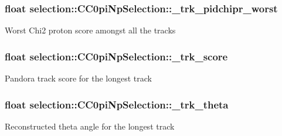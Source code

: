 \subsubsection[{\texorpdfstring{\+\_\+trk\+\_\+pidchipr\+\_\+worst}{_trk_pidchipr_worst}}]{\setlength{\rightskip}{0pt plus 5cm}float selection\+::\+C\+C0pi\+Np\+Selection\+::\+\_\+trk\+\_\+pidchipr\+\_\+worst\hspace{0.3cm}{\ttfamily [private]}}\hypertarget{classselection_1_1CC0piNpSelection_a6c06ff43f89cbee19cf466b830a6fe38}{}\label{classselection_1_1CC0piNpSelection_a6c06ff43f89cbee19cf466b830a6fe38}
Worst Chi2 proton score amongst all the tracks 
\subsubsection[{\texorpdfstring{\+\_\+trk\+\_\+score}{_trk_score}}]{\setlength{\rightskip}{0pt plus 5cm}float selection\+::\+C\+C0pi\+Np\+Selection\+::\+\_\+trk\+\_\+score\hspace{0.3cm}{\ttfamily [private]}}\hypertarget{classselection_1_1CC0piNpSelection_a72517a224dc19f95faef3efde9a999d1}{}\label{classselection_1_1CC0piNpSelection_a72517a224dc19f95faef3efde9a999d1}
Pandora track score for the longest track 
\subsubsection[{\texorpdfstring{\+\_\+trk\+\_\+theta}{_trk_theta}}]{\setlength{\rightskip}{0pt plus 5cm}float selection\+::\+C\+C0pi\+Np\+Selection\+::\+\_\+trk\+\_\+theta\hspace{0.3cm}{\ttfamily [private]}}\hypertarget{classselection_1_1CC0piNpSelection_a08cd38de74e9611829a3580a310c19f2}{}\label{classselection_1_1CC0piNpSelection_a08cd38de74e9611829a3580a310c19f2}
Reconstructed theta angle for the longest track 
